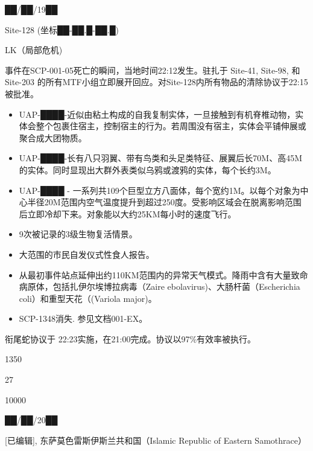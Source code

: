 


██/██/19██

Site-128 (坐标██-██.█-██.█)

LK（局部危机)

事件在SCP-001-05死亡的瞬间，当地时间22:12发生。驻扎于 Site-41, Site-98, 和 Site-203 的所有MTF小组立即展开回应。对Site-128内所有物品的清除协议于22:15被批准。


\begin{itemize}
	\item UAP-████-近似由粘土构成的自我复制实体，一旦接触到有机脊椎动物，实体会整个包裹住宿主，控制宿主的行为。若周围没有宿主，实体会平铺伸展或聚合成大团物质。
	\item UAP-████-长有八只羽翼、带有鸟类和头足类特征、展翼后长70M、高45M的实体。同时显现出大群外表类似乌鸦或渡鸦的实体，每个长约3M。
	\item UAP-████ - 一系列共109个巨型立方八面体，每个宽约1M。以每个对象为中心半径20M范围内空气温度提升到超过250度。受影响区域会在脱离影响范围后立即冷却下来。对象能以大约25KM每小时的速度飞行。
	\item 9次被记录的3级生物复活情景。
	\item 大范围的市民自发仪式性食人报告。
	\item 从最初事件站点延伸出约110KM范围内的异常天气模式。降雨中含有大量致命病原体，包括扎伊尔埃博拉病毒（Zaire ebolavirus)、大肠杆菌（Escherichia coli）和重型天花（(Variola major)。
	 \item SCP-1348消失. 参见文档001-EX。
\end{itemize}

 衔尾蛇协议于 22:23实施，在21:00完成。协议以97\%有效率被执行。

 1350

27

 10000




 ██/██/20██

[已编辑], 东萨莫色雷斯伊斯兰共和国（Islamic Republic of Eastern Samothrace）

